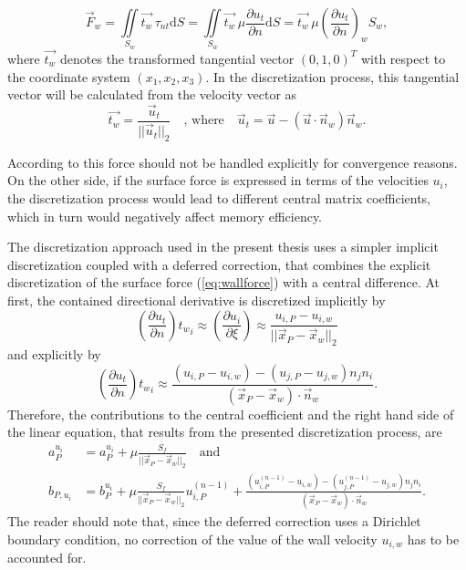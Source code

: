 \begin{equation}
  \label{eq:wallforce}
  \vec{F}_w 
  =  
  \iint\limits_{S_w} \vec{t_w} \, \tau_{nt} \mathrm{d}S
  =
  \iint\limits_{S_w} \vec{t_w} \, \mu \frac{\partial u_t}{\partial n} \mathrm{d}S
  =
  \vec{t_w} \, \mu \left(\frac{\partial u_t}{\partial n}\right)_w S_w,
\end{equation}
where \( \vec{t_w} \) denotes the transformed tangential vector \((0,1,0)^T\) with respect to the coordinate system \((x_1,x_2,x_3)\). In the discretization process, this tangential vector will be calculated from the velocity vector as
\begin{displaymath}
  \vec{t_w} = \frac{\vec{u}_t}{|| \vec{u}_t ||_2} \quad \text{, where} \quad \vec{u}_t = \vec{u} - \left( \vec{u} \cdot \vec{n}_w \right) \vec{n}_w.
\end{displaymath}

According to \cite{ferziger02} this force should not be handled explicitly for convergence reasons. On the other side, if the surface force is expressed in terms of the velocities \(u_i\), the discretization process would lead to different central matrix coefficients, which in turn would negatively affect memory efficiency.

The discretization approach used in the present thesis uses a simpler implicit discretization coupled with a deferred correction, that combines the explicit discretization of the surface force (\ref{eq:wallforce}) with a central difference. At first, the contained directional derivative is discretized implicitly by
\begin{displaymath}
  \left(\frac{\partial u_t}{\partial n}\right) {t_w}_i
  \approx
  \left(\frac{\partial u_i}{\partial \xi}\right)
  \approx
  \frac{u_{i,P} - u_{i,w}}{|| \vec{x}_P - \vec{x}_w ||_2}
\end{displaymath}
and explicitly by
\begin{displaymath}
  \left(\frac{\partial u_t}{\partial n}\right) {t_w}_i
  \approx
  \frac{\left(u_{i,P}- u_{i,w} \right) - \left(u_{j,P} - u_{j,w}\right) n_j n_i  }{\left( \vec{x}_P - \vec{x}_w \right) \cdot \vec{n}_w}.
\end{displaymath}
Therefore, the contributions to the central coefficient and the right hand side of the linear equation, that results from the presented discretization process, are
\begin{align*}
  a_P^{u_i} &= a_P^{u_i} + \mu \frac{S_f}{|| \vec{x}_P - \vec{x}_w ||_2} \quad \text{and} \\
  b_{P,u_i} &= b_P^{u_i} + \mu \frac{S_f}{|| \vec{x}_P - \vec{x}_w ||_2} u_{i,P}^{(n-1)} + 
  \frac{\left(u_{i,P}^{(n-1)}- u_{i,w} \right) - \left(u_{j,P}^{(n-1)} - u_{j,w}\right) n_j n_i  }{\left( \vec{x}_P - \vec{x}_w \right) \cdot \vec{n}_w}.
\end{align*}
The reader should note that, since the deferred correction uses a Dirichlet boundary condition, no correction of the value of the wall velocity \(u_{i,w}\) has to be accounted for.

